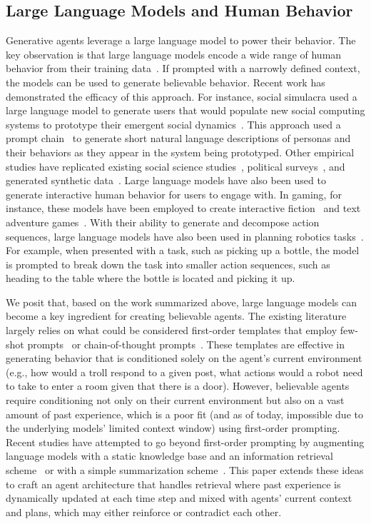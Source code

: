 \subsection{Large Language Models and Human Behavior} Generative agents leverage a large language model to power their behavior. The key observation is that large language models encode a wide range of human behavior from their training data~\cite{59_brown2020language, 60_bommasani2022opportunities}. If prompted with a narrowly defined context, the models can be used to generate believable behavior. Recent work has demonstrated the efficacy of this approach. For instance, social simulacra used a large language model to generate users that would populate new social computing systems to prototype their emergent social dynamics~\cite{9_park2022socialsimulacra}. This approach used a prompt chain~\cite{61_Wu2022PromptChainer, 62_Wu2021AIChains} to generate short natural language descriptions of personas and their behaviors as they appear in the system being prototyped. Other empirical studies have replicated existing social science studies~\cite{63_horton2023large}, political surveys~\cite{64_Sorensen_2022}, and generated synthetic data~\cite{hamalainen2023evaluating}. Large language models have also been used to generate interactive human behavior for users to engage with. In gaming, for instance, these models have been employed to create interactive fiction~\cite{65_Freiknecht2020Procedural} and text adventure games~\cite{66_callison-burch-etal-2022-dungeons}. With their ability to generate and decompose action sequences, large language models have also been used in planning robotics tasks~\cite{67_huang2022inner}. For example, when presented with a task, such as picking up a bottle, the model is prompted to break down the task into smaller action sequences, such as heading to the table where the bottle is located and picking it up.

We posit that, based on the work summarized above, large language models can become a key ingredient for creating believable agents. The existing literature largely relies on what could be considered first-order templates that employ few-shot prompts~\cite{68_Gao2020Making, 69_Liu2021What} or chain-of-thought prompts~\cite{70_wei2023chainofthought}. These templates are effective in generating behavior that is conditioned solely on the agent's current environment (e.g., how would a troll respond to a given post, what actions would a robot need to take to enter a room given that there is a door). However, believable agents require conditioning not only on their current environment but also on a vast amount of past experience, which is a poor fit (and as of today, impossible due to the underlying models' limited context window) using first-order prompting. Recent studies have attempted to go beyond first-order prompting by augmenting language models with a static knowledge base and an information retrieval scheme~\cite{khattab2023demonstratesearchpredict} or with a simple summarization scheme~\cite{wu2021recursively}. This paper extends these ideas to craft an agent architecture that handles retrieval where past experience is dynamically updated at each time step and mixed with agents' current context and plans, which may either reinforce or contradict each other.


